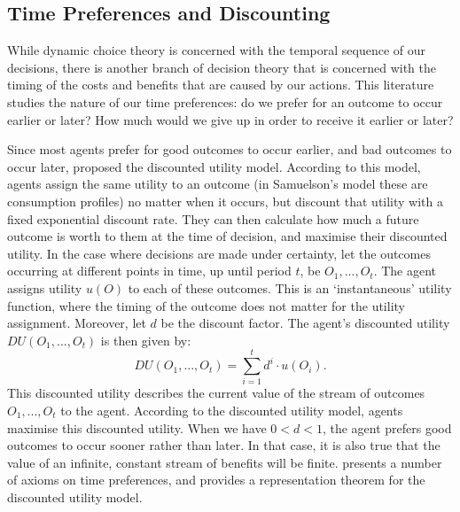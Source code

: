 \subsection{Time Preferences and Discounting}\label{subs72}

While dynamic choice theory is concerned with the temporal sequence of our decisions, there is another branch of decision theory that is concerned with the timing of the costs and benefits that are caused by our actions. This literature studies the nature of our time preferences: do we prefer for an outcome to occur earlier or later? How much would we give up in order to receive it earlier or later?

Since most agents prefer for good outcomes to occur earlier, and bad outcomes to occur later, \citet{Samuelson1937} proposed the discounted utility model. According to this model, agents assign the same utility to an outcome (in Samuelson's model these are consumption profiles) no matter when it occurs, but discount that utility with a fixed exponential discount rate. They can then calculate how much a future outcome is worth to them at the time of decision, and maximise their discounted utility. In the case where decisions are made under certainty, let the outcomes occurring at different points in time, up until period $t$, be $O_1, ..., O_t$. The agent assigns utility $u(O)$ to each of these outcomes. This is an `instantaneous' utility function, where the timing of the outcome does not matter for the utility assignment. Moreover, let $d$ be the discount factor. The agent's discounted utility $DU(O_1, ..., O_t)$ is then given by:
$$DU(O_1, ..., O_t) = \sum\limits_{i=1}^t d^i \cdot u (O_{i}).$$
This discounted utility describes the current value of the stream of outcomes $O_1, ..., O_t$ to the agent. According to the discounted utility model, agents maximise this discounted utility. When we have $0 < d < 1$, the agent prefers good outcomes to occur sooner rather than later. In that case, it is also true that the value of an infinite, constant stream of benefits will be finite. \citet{Koopmans1960} presents a number of axioms on time preferences, and provides a representation theorem for the discounted utility model.

